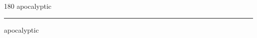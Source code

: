 
\begin{frame}
\begin{center}
\begin{turn}{180}
{\fontsize{2.5cm}{1em}\selectfont apocalyptic}
\end{turn}
\vspace{1em}\par  
\hrule
\vspace{1em}\par  
{\fontsize{2.5cm}{1em}\selectfont apocalyptic}
\end{center}
\end{frame}
